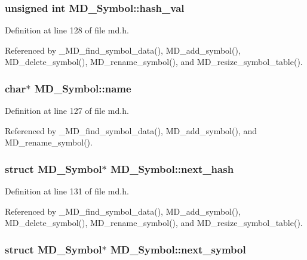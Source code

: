 \subsubsection{\setlength{\rightskip}{0pt plus 5cm}unsigned int \bf{MD\_\-Symbol::hash\_\-val}}\label{structMD__Symbol_ca1c5d2590ea6d3596509cbda609c17f}




Definition at line 128 of file md.h.

Referenced by \_\-MD\_\-find\_\-symbol\_\-data(), MD\_\-add\_\-symbol(), MD\_\-delete\_\-symbol(), MD\_\-rename\_\-symbol(), and MD\_\-resize\_\-symbol\_\-table().
\subsubsection{\setlength{\rightskip}{0pt plus 5cm}char$\ast$ \bf{MD\_\-Symbol::name}}\label{structMD__Symbol_c1f5b009dcdeaa7053dfe86d836bf84a}




Definition at line 127 of file md.h.

Referenced by \_\-MD\_\-find\_\-symbol\_\-data(), MD\_\-add\_\-symbol(), and MD\_\-rename\_\-symbol().
\subsubsection{\setlength{\rightskip}{0pt plus 5cm}struct \bf{MD\_\-Symbol}$\ast$ \bf{MD\_\-Symbol::next\_\-hash}}\label{structMD__Symbol_f6b13af2baf75686f687b6bf36ce4557}




Definition at line 131 of file md.h.

Referenced by \_\-MD\_\-find\_\-symbol\_\-data(), MD\_\-add\_\-symbol(), MD\_\-delete\_\-symbol(), MD\_\-rename\_\-symbol(), and MD\_\-resize\_\-symbol\_\-table().
\subsubsection{\setlength{\rightskip}{0pt plus 5cm}struct \bf{MD\_\-Symbol}$\ast$ \bf{MD\_\-Symbol::next\_\-symbol}}\label{structMD__Symbol_4dd85652e838c99c2433920977d49d8b}




